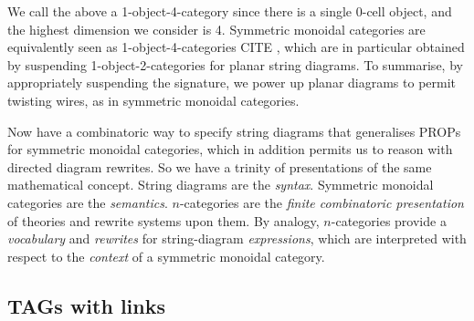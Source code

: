 We call the above a 1-object-4-category since there is a single 0-cell object, and the highest dimension we consider is 4. Symmetric monoidal categories are equivalently seen as 1-object-4-categories \bR CITE \e, which are in particular obtained by suspending 1-object-2-categories for planar string diagrams. To summarise, by appropriately suspending the signature, we power up planar diagrams to permit twisting wires, as in symmetric monoidal categories.\\

\begin{remark}
Now have a combinatoric way to specify string diagrams that generalises PROPs for symmetric monoidal categories, which in addition permits us to reason with directed diagram rewrites. So we have a trinity of presentations of the same mathematical concept. String diagrams are the \emph{syntax}. Symmetric monoidal categories are the \emph{semantics}. $n$-categories are the \emph{finite combinatoric presentation} of theories and rewrite systems upon them. By analogy, $n$-categories provide a \emph{vocabulary} and \emph{rewrites} for string-diagram \emph{expressions}, which are interpreted with respect to the \emph{context} of a symmetric monoidal category.
\end{remark}

\subsection{TAGs with links}


